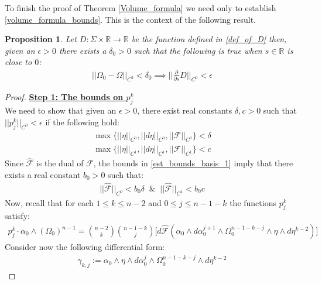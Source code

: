 \documentclass[11pt]{amsart}
\theoremstyle{plain}
\newtheorem{proposition}[theorem]{Proposition}
\theoremstyle{definition}
\theoremstyle{remark}
\begin{document}
To finish the proof of Theorem \ref{Volume_formula} we need only to establish \eqref{volume_formula_bounds}. This is the context of the following result.
\begin{proposition}
Let $D: \Sigma \times\mathbb{R} \rightarrow \mathbb{R}$ be the function defined in \eqref{def_of_D} then, given an $\epsilon>0$ there exists a $\delta_0 >0$ such that the following is true when $s \in \mathbb{R}$ is close to $0$:
\begin{align}
 \vert\vert \Omega_0 - \Omega\vert\vert_{C^2} < \delta_0 \implies   \Big\vert\Big\vert\frac{\partial}{\partial s}D\Big\vert\Big\vert_{C^0} < \epsilon
\end{align}
\end{proposition}
\begin{proof}
\textbf{\underline{Step 1: The bounds on $p^k_j$}}\\
We need to show that given an $\epsilon>0$, there exist real constants $\delta, c>0$ such that $\vert\vert p^k_j\vert\vert_{C^0} < \epsilon$ if the following hold:
\begin{align}\label{est_bounds_basis_1}
  \max \bigg\{\vert\vert\eta\vert\vert_{C^0}, \vert\vert d\eta\vert\vert_{C^0}, \vert\vert\mathcal{F}\vert\vert_{C^0} \bigg\} < \delta \\\nonumber
\max \bigg\{\vert\vert\eta\vert\vert_{C^1}, \vert\vert d\eta\vert\vert_{C^1}, \vert\vert\mathcal{F}\vert\vert_{C^1} \bigg\} < c
  \end{align}
Since $\hat{\mathcal{F}}$ is the dual of $\mathcal{F}$, the bounds in \eqref{est_bounds_basis_1} imply that there exists a real constant $b_0 >0$ such that:
\begin{align}\label{F_dual_bounds}
    \vert\vert\hat{\mathcal{F}}\vert\vert_{C^0} < b_0 \delta \; \; \& \;\; \vert\vert\hat{\mathcal{F}}\vert\vert_{C^1} <  b_0 c
\end{align}
Now, recall that for each $1 \leq k \leq n-2$ and $0\leq j \leq n-1-k$ the functions $p^k_j$ satisfy:
\begin{align*}
     p^k_j \cdot \alpha_0 \wedge (\Omega_0)^{n-1} = \binom{n-2}{k} \binom{n-1-k}{j}  \Bigg[ d\hat{\mathcal{F}}(\alpha_0 \wedge d\alpha^{j+1}_0 \wedge \Omega^{n-1-k-j}_0 \wedge \eta \wedge d\eta^{k-2})\Bigg]
\end{align*}
Consider now the following differential form:
\begin{align}\label{def_of_gamma_k_j}
    \gamma_{k,j}:= \alpha_0 \wedge \eta \wedge d\alpha^j_0 \wedge \Omega^{n-1-k-j}_0 \wedge d\eta^{k-2}
\end{align}

\end{proof}
\end{document}
